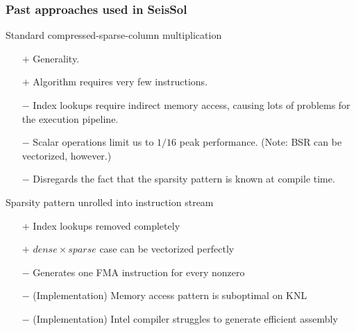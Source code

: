 \documentclass[9pt]{beamer}
\begin{document}
\begin{frame}
  \frametitle{Past approaches used in SeisSol}
  \begin{block}{Standard compressed-sparse-column multiplication}
    \begin{itemize}
      \item[$+$] Generality.
      \item[$+$] Algorithm requires very few instructions.
      \item[$-$] Index lookups require indirect memory access, causing lots of problems for the execution pipeline.
      \item[$-$] Scalar operations limit us to $1/16$ peak performance. (Note: BSR can be vectorized, however.)
      \item[$-$] Disregards the fact that the sparsity pattern is known at compile time.
    \end{itemize}
  \end{block}

  \begin{block}{Sparsity pattern unrolled into instruction stream}
    \begin{itemize}
    \item[$+$] Index lookups removed completely
    \item[$+$] $dense \times sparse$ case can be vectorized perfectly 
    \item[$-$] Generates one FMA instruction for every nonzero
    \item[$-$] (Implementation) Memory access pattern is suboptimal on KNL
    \item[$-$] (Implementation) Intel compiler struggles to generate efficient assembly
    \end{itemize}
  \end{block}
\end{frame}
\end{document}
